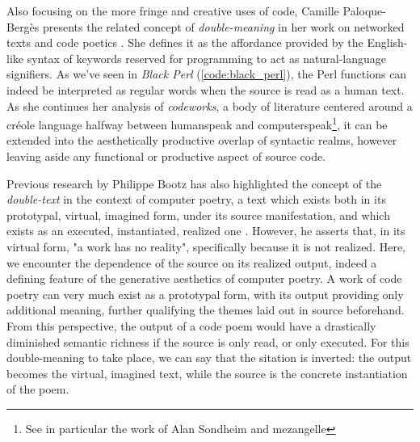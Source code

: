 Also focusing on the more fringe and creative uses of code, Camille Paloque-Bergès presents the related concept of \emph{double-meaning} in her work on networked texts and code poetics \citep{paloque-berges_poetique_2009}. She defines it as the affordance provided by the English-like syntax of keywords reserved for programming to act as natural-language signifiers. As we've seen in \emph{Black Perl} (\ref{code:black_perl}), the Perl functions can indeed be interpreted as regular words when the source is read as a human text. As she continues her analysis of \emph{codeworks}, a body of literature centered around a créole language halfway between humanspeak and computerspeak\footnote{See in particular the work of Alan Sondheim and mezangelle}, it can be extended into the aesthetically productive overlap of syntactic realms, however leaving aside any functional or productive aspect of source code.

Previous research by Philippe Bootz has also highlighted the concept of the \emph{double-text} in the context of computer poetry, a text which exists both in its prototypal, virtual, imagined form, under its source manifestation, and which exists as an executed, instantiated, realized one \citep{bootz_problem_2005}. However, he asserts that, in its virtual form, "a work has no reality", specifically because it is not realized. Here, we encounter the dependence of the source on its realized output, indeed a defining feature of the generative aesthetics of computer poetry. A work of code poetry can very much exist as a prototypal form, with its output providing only additional meaning, further qualifying the themes laid out in source beforehand. From this perspective, the output of a code poem would have a drastically diminished semantic richness if the source is only read, or only executed. For this double-meaning to take place, we can say that the sitation is inverted: the output becomes the virtual, imagined text, while the source is the concrete instantiation of the poem.

